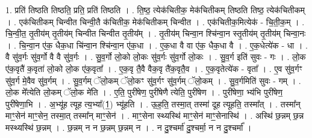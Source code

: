 \documentclass[17pt]{extarticle}
\begin{document}
1. प्रति॑ तिष्ठति तिष्ठति॒ प्रति॒ प्रति॑ तिष्ठति । . ति॒ष्ठ॒ त्येक॑चितीक॒ मेक॑चितीकम् तिष्ठति तिष्ठ॒ त्येक॑चितीकम् । . एक॑चितीकम् चिन्वीत चिन्वी॒तै क॑चितीक॒ मेक॑चितीकम् चिन्वीत । . एक॑चितीक॒मित्येक॑ - चि॒ती॒क॒म् । . चि॒न्वी॒त॒ तृ॒तीय॑म् तृ॒तीय॑म् चिन्वीत चिन्वीत तृ॒तीय᳚म् । . तृ॒तीय॑म् चिन्वा॒न श्चि॑न्वा॒न स्तृ॒तीय॑म् तृ॒तीय॑म् चिन्वा॒नः । . चि॒न्वा॒न ए॑क॒ धैक॒धा चि॑न्वा॒न श्चि॑न्वा॒न ए॑क॒धा । . ए॒क॒धा वै वा ए॑क॒ धैक॒धा वै । . ए॒क॒धेत्ये॑क - धा । . वै सु॑व॒र्गः सु॑व॒र्गो वै वै सु॑व॒र्गः । . सु॒व॒र्गो लो॒को लो॒कः सु॑व॒र्गः सु॑व॒र्गो लो॒कः । . सु॒व॒र्ग इति॑ सुवः - गः । . लो॒क ए॑क॒वृतै॑ क॒वृता॑ लो॒को लो॒क ए॑क॒वृता᳚ । . ए॒क॒वृ तै॒वै वैक॒वृ तै॑क॒वृतै॒व । . ए॒क॒वृतेत्ये॑क - वृता᳚ । . ए॒व सु॑व॒र्गꣳ सु॑व॒र्ग मे॒वैव सु॑व॒र्गम् । . सु॒व॒र्गम् ॅलो॒कम् ॅलो॒कꣳ सु॑व॒र्गꣳ सु॑व॒र्गम् ॅलो॒कम् । . सु॒व॒र्गमिति॑ सुवः - गम् । . लो॒क मे᳚त्येति लो॒कम् ॅलो॒क मे॑ति । . ए॒ति॒ पुरी॑षेण॒ पुरी॑षेणै त्येति॒ पुरी॑षेण । . पुरी॑षेणा॒ भ्य॑भि पुरी॑षेण॒ पुरी॑षेणा॒भि । . अ॒भ्यू॑ह त्यूह त्य॒भ्या᳚(1॒) भ्यू॑हति । . ऊ॒ह॒ति॒ तस्मा॒त् तस्मा॑ दूह त्यूहति॒ तस्मा᳚त् । . तस्मा᳚न् माꣳ॒॒सेन॑ माꣳ॒॒सेन॒ तस्मा॒त् तस्मा᳚न् माꣳ॒॒सेन॑ । . माꣳ॒॒सेना स्थ्यस्थि॑ माꣳ॒॒सेन॑ माꣳ॒॒सेनास्थि॑ । . अस्थि॑ छ॒न्नम् छ॒न्न मस्थ्यस्थि॑ छ॒न्नम् । . छ॒न्नम् न न छ॒न्नम् छ॒न्नम् न । . न दु॒श्चर्मा॑ दु॒श्चर्मा॒ न न दु॒श्चर्मा᳚ । \newline
\end{document}
